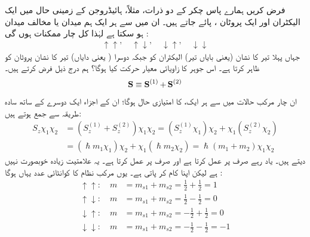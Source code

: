 فرض کریں ہمارے پاس  چکر کے دو ذرات، مثلاً،   ہائیڈروجن کے زمینی حال  میں ایک الیکٹران اور ایک پروٹان ،  پائے جاتے ہیں۔ ان میں سے ہر ایک ہم میدان یا مخالف میدان ہو سکتا ہے لہٰذا کل چار ممکنات ہوں  گی :
\begin{align}
\uparrow \uparrow, \quad \uparrow \downarrow, \quad \downarrow \uparrow, \quad \downarrow \downarrow
\end{align}
جہاں پہلا تیر کا نشان (یعنی بایاں تیر)  الیکٹران کو جبکہ دوسرا ( یعنی دایاں)  تیر کا نشان پروٹان کو ظاہر کرتا ہے۔   اس جوہر کا   زاویائی معیار حرکت کیا ہوگا؟ ہم درج ذیل فرض کرتے ہیں۔ 
\begin{align} 
\operatorname{\mathbf{S}} \equiv \operatorname{\mathbf{S}}^{(1)} + \operatorname{\mathbf{S}}^{(2)}
\end{align}
ان چار مرکب حالات میں سے ہر ایک،   کا امتیازی حال ہوگا؛ ان کے  اجزاء  ایک دوسرے کے ساتھ سادہ طریقہ سے  جمع ہوتے ہیں:
\begin{align*}
S_z \chi_1 \chi_2 &= (S_z^{(1)} + S_z^{(2)} ) \chi_1 \chi_2 = (S_z^{(1)} \chi_1) \chi_2 + \chi_1 (S_z^{(2)} \chi_2) \\
&= (\hslash m_1 \chi_1) \chi_2 + \chi_1 (\hslash m_2 \chi_2) = \hslash (m_1 + m_2) \chi_1 \chi_2
\end{align*}
 دیتے ہیں۔ یاد رہے   صرف  پر عمل کرتا ہے اور   صرف  پر عمل کرتا ہے۔ یہ علامتیت زیادہ خوبصورت نہیں ہے لیکن اپنا کام کر پاتی ہے۔ یوں مرکب نظام کا کوانٹائی عدد  یہاں  ہوگا :
\begin{align*}
\uparrow \uparrow: \quad m &= m_{s1} + m_{s2} = \frac{1}{2} + \frac{1}{2} = 1 \\
\uparrow \downarrow: \quad m &= m_{s1} + m_{s2} = \frac{1}{2} -\frac{1}{2} = 0 \\
\downarrow \uparrow: \quad m &= m_{s1} + m_{s2} = -\frac{1}{2} + \frac{1}{2} = 0 \\
\downarrow \downarrow: \quad m &= m_{s1} + m_{s2} = -\frac{1}{2} - \frac{1}{2} = -1 
\end{align*} 


